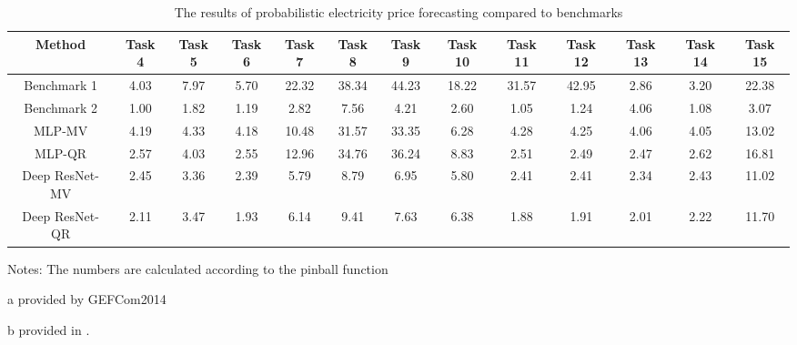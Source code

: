 \documentclass[review]{elsarticle}
\begin{document}
    \begin{table}[H]
      \caption{The results of probabilistic electricity price forecasting compared to benchmarks}
      \begin{adjustbox}{width=\textwidth}
      \begin{threeparttable}
        \begin{center}
          \begin{tabular}{ccccccccccccc}
            \hline
            Method & Task 4 & Task 5& Task 6 & Task 7& Task 8 & Task 9& Task 10 & Task 11& Task 12 & Task 13 & Task 14 & Task 15\\
            \hline
            Benchmark 1 \tnote{a} & 4.03 & 7.97 & 5.70 & 22.32 & 38.34 & 44.23 & 18.22 & 31.57 & 42.95 & 2.86 & 3.20 & 22.38\\
            Benchmark 2 \tnote{b} & 1.00 & 1.82 & 1.19 & 2.82 & 7.56 & 4.21 & 2.60 & 1.05 & 1.24 & 4.06 & 1.08 & 3.07 \\
            \hline
            MLP-MV & 4.19 & 4.33 & 4.18 & 10.48 & 31.57 & 33.35 & 6.28 & 4.28 & 4.25 & 4.06 & 4.05 & 13.02\\
            MLP-QR & 2.57 & 4.03 & 2.55 & 12.96 & 34.76 & 36.24 & 8.83 & 2.51 & 2.49 & 2.47 & 2.62 & 16.81\\
            Deep ResNet-MV& 2.45 & 3.36 & 2.39 & 5.79 & 8.79 & 6.95 & 5.80 & 2.41 & 2.41 & 2.34 & 2.43 & 11.02 \\
            Deep ResNet-QR& 2.11& 3.47& 1.93 & 6.14 & 9.41 & 7.63 & 6.38 & 1.88 & 1.91 & 2.01 & 2.22 &11.70 \\
            \hline
          \end{tabular}
          \begin{tablenotes}
            Notes: The numbers are calculated according to the pinball function
            \item[a] provided by GEFCom2014
            \item[b] provided in \cite{Maciejowska2016}.
          \end{tablenotes}
          \end{center}
      \end{threeparttable}
      \end{adjustbox}
      \label{table:result_pinball}
    \end{table}
\end{document}
